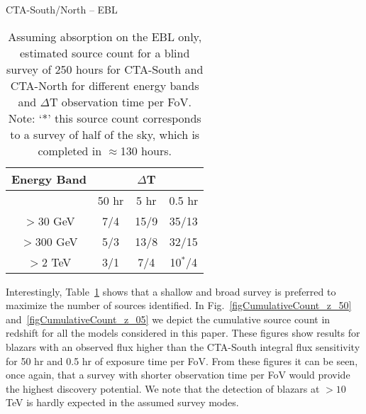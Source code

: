 \documentclass[final,5p]{elsarticle}
\begin{document}
\begin{table}[h!]
\begin{center}
 CTA-South/North -- EBL\\
\begin{tabular}{cccc}
\midrule
Energy Band & & $\Delta$T \\ \midrule
  & 50 hr  & 5 hr & 0.5 hr\\
\addlinespace
$>$30 GeV   &  7/4   &  15/9  &  35/13\\
$>$300 GeV    &  5/3  &  13/8  &  32/15\\
$>$2 TeV    &  3/1  &  7/4  &  10$^*$/4  \\
 \bottomrule
\end{tabular}
\end{center}
\caption{Assuming absorption on the EBL only, estimated source count for a blind survey of 250 hours for CTA-South and CTA-North for different energy bands and $\Delta$T observation time per FoV. Note: `*' this source count corresponds to a survey of half of the sky, which is completed in $\approx$130 hours. }
\label{tabSource}
\end{table}
Interestingly, Table~\ref{tabSource} shows that a shallow and broad survey is preferred to maximize the number of sources identified.
In Fig.~\ref{figCumulativeCount_z_50} and~\ref{figCumulativeCount_z_05} we depict the cumulative source count in redshift for all the models considered in this paper. These figures show results for blazars with an observed flux higher than the CTA-South integral flux sensitivity for 50 hr and 0.5 hr of exposure time per FoV.
From these figures it can be seen, once again, that a survey with shorter observation time per FoV would provide the highest discovery potential. We note that the detection of blazars at $>10$ TeV is hardly expected in the assumed survey modes. 
\end{document}
